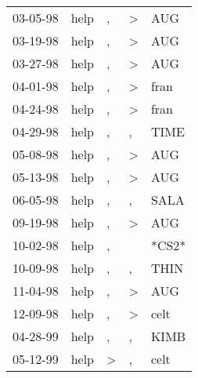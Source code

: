 \begin{supertabular}{p{0.07\textwidth}p{0.06\textwidth}p{0.02\textwidth}p{0.02\textwidth}p{0.06\textwidth}}
 03-05-98\textsuperscript{} &  help\textsuperscript{} &             , &  \textgreater &   AUG\textsuperscript{} \\
 03-19-98\textsuperscript{} &  help\textsuperscript{} &             , &  \textgreater &   AUG\textsuperscript{} \\
 03-27-98\textsuperscript{} &  help\textsuperscript{} &             , &  \textgreater &   AUG\textsuperscript{} \\
 04-01-98\textsuperscript{} &  help\textsuperscript{} &             , &  \textgreater &  fran\textsuperscript{} \\
 04-24-98\textsuperscript{} &  help\textsuperscript{} &             , &  \textgreater &  fran\textsuperscript{} \\
 04-29-98\textsuperscript{} &  help\textsuperscript{} &             , &             , &  TIME\textsuperscript{} \\
 05-08-98\textsuperscript{} &  help\textsuperscript{} &             , &  \textgreater &   AUG\textsuperscript{} \\
 05-13-98\textsuperscript{} &  help\textsuperscript{} &             , &  \textgreater &   AUG\textsuperscript{} \\
 06-05-98\textsuperscript{} &  help\textsuperscript{} &             , &             , &  SALA\textsuperscript{} \\
 09-19-98\textsuperscript{} &  help\textsuperscript{} &             , &  \textgreater &   AUG\textsuperscript{} \\
 10-02-98\textsuperscript{} &  help\textsuperscript{} &             , &               &                   *CS2* \\
 10-09-98\textsuperscript{} &  help\textsuperscript{} &             , &             , &  THIN\textsuperscript{} \\
 11-04-98\textsuperscript{} &  help\textsuperscript{} &             , &  \textgreater &   AUG\textsuperscript{} \\
 12-09-98\textsuperscript{} &  help\textsuperscript{} &             , &  \textgreater &  celt\textsuperscript{} \\
 04-28-99\textsuperscript{} &  help\textsuperscript{} &             , &             , &  KIMB\textsuperscript{} \\
 05-12-99\textsuperscript{} &  help\textsuperscript{} &  \textgreater &             , &  celt\textsuperscript{} \\

\end{supertabular}
